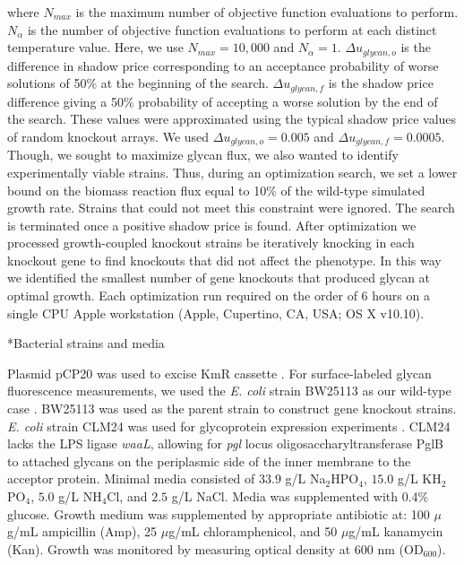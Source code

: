 \documentclass[12pt]{article}
\makeatletter
\renewcommand\subsection{\@startsection
	{subsection}{2}{0mm}
	{-0.05in}
	{-0.5\baselineskip}
	{\normalfont\normalsize\bfseries}}
\makeatother
\begin{document}
where $N_{max}$ is the maximum number of objective function evaluations to perform. 
$N_{\alpha}$ is the number of objective function evaluations to perform at each distinct temperature value. 
Here, we use $N_{max} = 10,000$ and $N_{\alpha} = 1$. 
$\Delta u_{glycan,o}$ is the difference in shadow price corresponding to an acceptance probability of worse solutions of 50\% at the beginning of the search. 
$\Delta u_{glycan,f}$ is the shadow price difference giving a 50\% probability of accepting a worse solution by the end of the search. 
These values were approximated using the typical shadow price values of random knockout arrays. 
We used $\Delta u_{glycan,o} = 0.005$ and $\Delta u_{glycan,f} = 0.0005$. 
Though, we sought to maximize glycan flux, we also wanted to identify experimentally viable strains. 
Thus, during an optimization search, we set a lower bound on the biomass reaction flux equal to 10\% of the wild-type simulated growth rate. 
Strains that could not meet this constraint were ignored. 
The search is terminated once a positive shadow price is found. 
After optimization we processed growth-coupled knockout strains be iteratively knocking in each knockout gene to find knockouts that did not affect the phenotype. 
In this way we identified the smallest number of gene knockouts that produced glycan at optimal growth. 
Each optimization run required on the order of $6$ hours on a single CPU Apple workstation (Apple, Cupertino, CA, USA; OS X v10.10). 

\subsection*{Bacterial strains and media}

Plasmid pCP20 was used to excise KmR cassette \cite{1995-cherepanov-wackernagel-Gene}.
For surface-labeled glycan fluorescence measurements, we used the \textit{E. coli} strain BW25113 as our wild-type case \cite{2006-baba-tomita-mori-MolSysBio}. 
BW25113 was used as the parent strain to construct gene knockout strains. 
\textit{E. coli} strain CLM24 was used for glycoprotein expression experiments \cite{2005-feldman-aebi-PNAS}. 
CLM24 lacks the LPS ligase \textit{waaL}, allowing for \textit{pgl} locus oligosaccharyltransferase PglB to attached glycans on the periplasmic side of the inner membrane to the acceptor protein. 
Minimal media consisted of $33.9$ g/L Na$_2$HPO$_4$, $15.0$ g/L KH$_2$PO$_4$, $5.0$ g/L NH$_4$Cl, and $2.5$ g/L NaCl. 
Media was supplemented with 0.4\% glucose. 
Growth medium was supplemented by appropriate antibiotic at: 100 $\mu$g/mL ampicillin (Amp), 25 $\mu$g/mL chloramphenicol, and 50 $\mu$g/mL kanamycin (Kan). 
Growth was monitored by measuring optical density at 600 nm (OD$_{600}$). 
\end{document}
